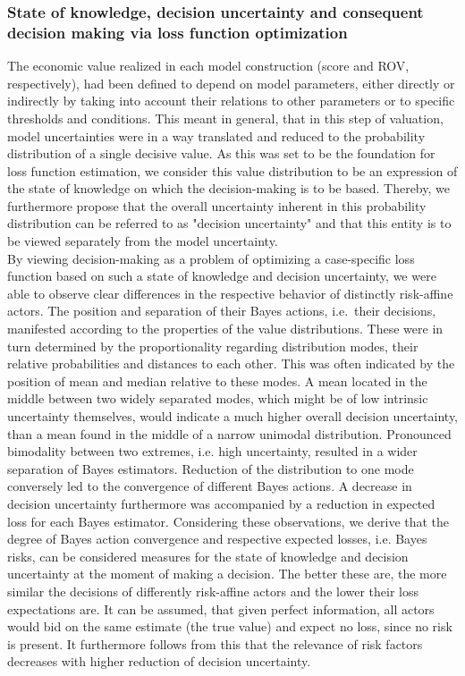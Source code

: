 	\subsubsection{State of knowledge, decision uncertainty and consequent decision making via loss function optimization}
	The economic value realized in each model construction (score and ROV, respectively), had been defined to depend on model parameters, either directly or indirectly by taking into account their relations to other parameters or to specific thresholds and conditions. This meant in general, that in this step of valuation, model uncertainties were in a way translated and reduced to the probability distribution of a single decisive value. As this was set to be the foundation for loss function estimation, we consider this value distribution to be an expression of the state of knowledge on which the decision-making is to be based. Thereby, we furthermore propose that the overall uncertainty inherent in this probability distribution can be referred to as "decision uncertainty" and that this entity is to be viewed separately from the model uncertainty.\\	
	By viewing decision-making as a problem of optimizing a case-specific loss function based on such a state of knowledge and decision uncertainty, we were able to observe clear differences in the respective behavior of distinctly risk-affine actors.
	The position and separation of their Bayes actions, i.e.\ their decisions, manifested according to the properties of the value distributions. These were in turn determined by the proportionality regarding distribution modes, their relative probabilities and distances to each other. This was often indicated by the position of mean and median relative to these modes. A mean located in the middle between two widely separated modes, which might be of low intrinsic uncertainty themselves, would indicate a much higher overall decision uncertainty, than a mean found in the middle of a narrow unimodal distribution. Pronounced bimodality between two extremes, i.e. high uncertainty, resulted in a wider separation of Bayes estimators. Reduction of the distribution to one mode conversely led to the convergence of different Bayes actions. A decrease in decision uncertainty furthermore was accompanied by a reduction in expected loss for each Bayes estimator. 
	Considering these observations, we derive that the degree of Bayes action convergence and respective expected losses, i.e. Bayes risks, can be considered measures for the state of knowledge and decision uncertainty at the moment of making a decision. The better these are, the more similar the decisions of differently risk-affine actors and the lower their loss expectations are. It can be assumed, that given perfect information, all actors would bid on the same estimate (the true value) and expect no loss, since no risk is present. It furthermore follows from this that the relevance of risk factors decreases with higher reduction of decision uncertainty.
